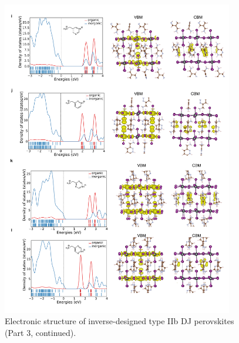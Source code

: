 \begin{figure}[htbp]
    \ContinuedFloat
    \centering
    \includegraphics[width=0.9\textwidth]{figures/synthesis-feasibility/figure5-25-3.png}
    \caption{Electronic structure of inverse-designed type IIb DJ perovskites (Part 3, continued).}
\end{figure}

